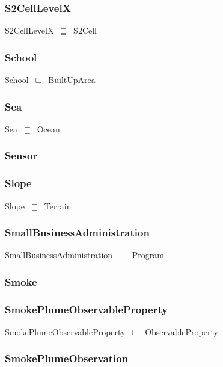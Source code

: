 \documentclass{article}
\begin{document}
\subsubsection*{S2CellLevelX}

S2CellLevelX~\ensuremath{\sqsubseteq}~S2Cell~

\subsubsection*{School}

School~\ensuremath{\sqsubseteq}~BuiltUpArea~

\subsubsection*{Sea}

Sea~\ensuremath{\sqsubseteq}~Ocean~

\subsubsection*{Sensor}

\subsubsection*{Slope}

Slope~\ensuremath{\sqsubseteq}~Terrain~

\subsubsection*{SmallBusinessAdministration}

SmallBusinessAdministration~\ensuremath{\sqsubseteq}~Program~

\subsubsection*{Smoke}

\subsubsection*{SmokePlumeObservableProperty}

SmokePlumeObservableProperty~\ensuremath{\sqsubseteq}~ObservableProperty~

\subsubsection*{SmokePlumeObservation}
\end{document}
